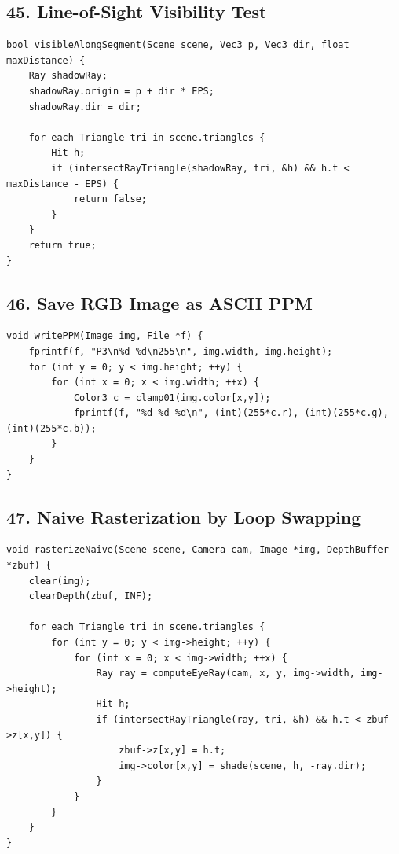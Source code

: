 \documentclass[10pt,letterpaper]{article}
\begin{document}
\subsection{45. Line-of-Sight Visibility Test}

\begin{verbatim}
bool visibleAlongSegment(Scene scene, Vec3 p, Vec3 dir, float maxDistance) {
    Ray shadowRay;
    shadowRay.origin = p + dir * EPS;
    shadowRay.dir = dir;

    for each Triangle tri in scene.triangles {
        Hit h;
        if (intersectRayTriangle(shadowRay, tri, &h) && h.t < maxDistance - EPS) {
            return false;
        }
    }
    return true;
}
\end{verbatim}

\subsection{46. Save RGB Image as ASCII PPM}

\begin{verbatim}
void writePPM(Image img, File *f) {
    fprintf(f, "P3\n%d %d\n255\n", img.width, img.height);
    for (int y = 0; y < img.height; ++y) {
        for (int x = 0; x < img.width; ++x) {
            Color3 c = clamp01(img.color[x,y]);
            fprintf(f, "%d %d %d\n", (int)(255*c.r), (int)(255*c.g), (int)(255*c.b));
        }
    }
}
\end{verbatim}

\subsection{47. Naive Rasterization by Loop Swapping}

\begin{verbatim}
void rasterizeNaive(Scene scene, Camera cam, Image *img, DepthBuffer *zbuf) {
    clear(img);
    clearDepth(zbuf, INF);

    for each Triangle tri in scene.triangles {
        for (int y = 0; y < img->height; ++y) {
            for (int x = 0; x < img->width; ++x) {
                Ray ray = computeEyeRay(cam, x, y, img->width, img->height);
                Hit h;
                if (intersectRayTriangle(ray, tri, &h) && h.t < zbuf->z[x,y]) {
                    zbuf->z[x,y] = h.t;
                    img->color[x,y] = shade(scene, h, -ray.dir);
                }
            }
        }
    }
}
\end{verbatim}
\end{document}
